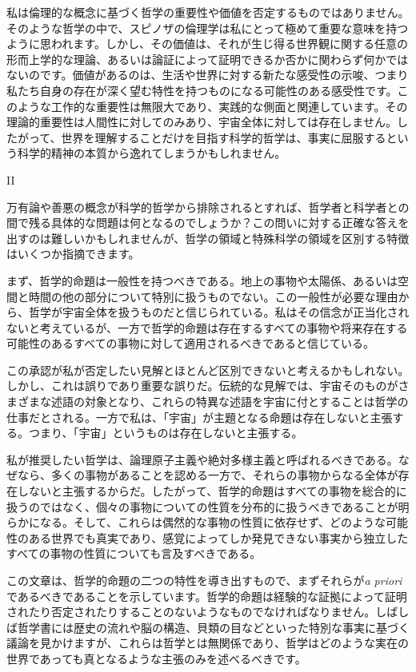 \documentclass[a4paper,11pt,openany]{ltjsbook}
\begin{document}
私は倫理的な概念に基づく哲学の重要性や価値を否定するものではありません。そのような哲学の中で、スピノザの倫理学は私にとって極めて重要な意味を持つように思われます。しかし、その価値は、それが生じ得る世界観に関する任意の形而上学的な理論、あるいは論証によって証明できるか否かに関わらず何かではないのです。価値があるのは、生活や世界に対する新たな感受性の示唆、つまり私たち自身の存在が深く望む特性を持つものになる可能性のある感受性です。このような工作的な重要性は無限大であり、実践的な側面と関連しています。その理論的重要性は人間性に対してのみあり、宇宙全体に対しては存在しません。したがって、世界を理解することだけを目指す科学的哲学は、事実に屈服するという科学的精神の本質から逸れてしまうかもしれません。

II

万有論や善悪の概念が科学的哲学から排除されるとすれば、哲学者と科学者との間で残る具体的な問題は何となるのでしょうか？この問いに対する正確な答えを出すのは難しいかもしれませんが、哲学の領域と特殊科学の領域を区別する特徴はいくつか指摘できます。

まず、哲学的命題は一般性を持つべきである。地上の事物や太陽係、あるいは空間と時間の他の部分について特別に扱うものでない。この一般性が必要な理由から、哲学が宇宙全体を扱うものだと信じられている。私はその信念が正当化されないと考えているが、一方で哲学的命題は存在するすべての事物や将来存在する可能性のあるすべての事物に対して適用されるべきであると信じている。

この承認が私が否定したい見解とほとんど区別できないと考えるかもしれない。しかし、これは誤りであり重要な誤りだ。伝統的な見解では、宇宙そのものがさまざまな述語の対象となり、これらの特異な述語を宇宙に付とすることは哲学の仕事だとされる。一方で私は、「宇宙」が主題となる命題は存在しないと主張する。つまり、「宇宙」というものは存在しないと主張する。

私が推奨したい哲学は、論理原子主義や絶対多様主義と呼ばれるべきである。なぜなら、多くの事物があることを認める一方で、それらの事物からなる全体が存在しないと主張するからだ。したがって、哲学的命題はすべての事物を総合的に扱うのではなく、個々の事物についての性質を分布的に扱うべきであることが明らかになる。そして、これらは偶然的な事物の性質に依存せず、どのような可能性のある世界でも真実であり、感覚によってしか発見できない事実から独立したすべての事物の性質についても言及すべきである。

この文章は、哲学的命題の二つの特性を導き出すもので、まずそれらが\textit{a priori}であるべきであることを示しています。哲学的命題は経験的な証拠によって証明されたり否定されたりすることのないようなものでなければなりません。しばしば哲学書には歴史の流れや脳の構造、貝類の目などといった特別な事実に基づく議論を見かけますが、これらは哲学とは無関係であり、哲学はどのような実在の世界であっても真となるような主張のみを述べるべきです。
\end{document}
